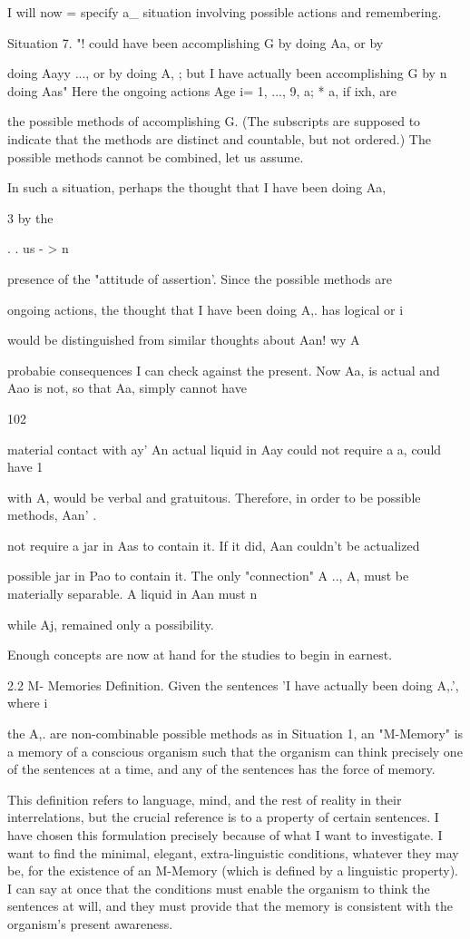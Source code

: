 \documentclass[10pt,twoside]{memoir}
\begin{document}
\begin{enumerate}
{{{{{{{{{{{{{{{{{{I will now = specify a_ situation involving possible actions and 
remembering. 

Situation 7. "! could have been accomplishing G by doing Aa, or by 


doing Aayy ..., or by doing A, ; but I have actually been accomplishing G by 
n 
doing Aas" Here the ongoing actions Age i= 1, ..., 9, a; * a, if ixh, are 


the possible methods of accomplishing G. (The subscripts are supposed to 
indicate that the methods are distinct and countable, but not ordered.) The 
possible methods cannot be combined, let us assume. 

In such a situation, perhaps the thought that I have been doing Aa, 


3 by the 

. . us - > n 

presence of the "attitude of assertion'. Since the possible methods are 

ongoing actions, the thought that I have been doing A,. has logical or 
i 


would be distinguished from similar thoughts about Aan! wy A 


probabie consequences I can check against the present. 
Now Aa, is actual and Aao is not, so that Aa, simply cannot have 


102 


material contact with ay' An actual liquid in Aay could not require a 
a, could have 
1 

with A, would be verbal and gratuitous. Therefore, in order to be possible 
methods, Aan' . 


not require a jar in Aas to contain it. If it did, Aan couldn't be actualized 


possible jar in Pao to contain it. The only "connection" A 
.., A, must be materially separable. A liquid in Aan must 
n 


while Aj, remained only a possibility. 


Enough concepts are now at hand for the studies to begin in earnest. 


2.2 M- Memories 
Definition. Given the sentences 'I have actually been doing A,.', where 
i 


the A,. are non-combinable possible methods as in Situation 1, an 
"M-Memory" is a memory of a conscious organism such that the organism 
can think precisely one of the sentences at a time, and any of the sentences 
has the force of memory. 

This definition refers to language, mind, and the rest of reality in their 
interrelations, but the crucial reference is to a property of certain sentences. 
I have chosen this formulation precisely because of what I want to 
investigate. I want to find the minimal, elegant, extra-linguistic conditions, 
whatever they may be, for the existence of an M-Memory (which is defined 
by a linguistic property). I can say at once that the conditions must enable 
the organism to think the sentences at will, and they must provide that the 
memory is consistent with the organism's present awareness. 

}}}}}}}}}}}}}}}}}}
\end{enumerate}
\end{document}
